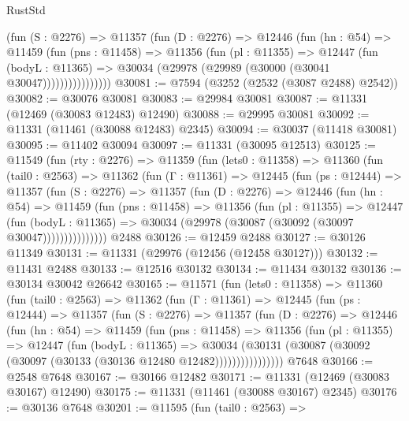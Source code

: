 \begin{lexlean}{RustStd}
\begin{coremodule}
                (fun (S : @2276) =>
                @11357
                  (fun (D : @2276) =>
                  @12446
                    (fun (hn : @54) =>
                    @11459
                      (fun (pns : @11458) =>
                      @11356
                        (fun (pl : @11355) =>
                        @12447
                          (fun (bodyL : @11365) =>
                          @30034 (@29978 (@29989 (@30000 (@30041 @30047))))))))))))))))
@30081 := @7594 (@3252 (@2532 (@3087 @2488) @2542))
@30082 := @30076 @30081
@30083 := @29984 @30081
@30087 := @11331 (@12469 (@30083 @12483) @12490)
@30088 := @29995 @30081
@30092 := @11331 (@11461 (@30088 @12483) @2345)
@30094 := @30037 (@11418 @30081)
@30095 := @11402 @30094
@30097 := @11331 (@30095 @12513)
@30125 := @11549
    (fun (rty : @2276) =>
    @11359
      (fun (lets0 : @11358) =>
      @11360
        (fun (tail0 : @2563) =>
        @11362
          (fun (Γ : @11361) =>
          @12445
            (fun (ps : @12444) =>
            @11357
              (fun (S : @2276) =>
              @11357
                (fun (D : @2276) =>
                @12446
                  (fun (hn : @54) =>
                  @11459
                    (fun (pns : @11458) =>
                    @11356
                      (fun (pl : @11355) =>
                      @12447
                        (fun (bodyL : @11365) =>
                        @30034 (@29978 (@30087 (@30092 (@30097 @30047)))))))))))))))
    @2488
@30126 := @12459 @2488
@30127 := @30126 @11349
@30131 := @11331 (@29976 (@12456 (@12458 @30127)))
@30132 := @11431 @2488
@30133 := @12516 @30132
@30134 := @11434 @30132
@30136 := @30134 @30042 @26642
@30165 := @11571
    (fun (lets0 : @11358) =>
    @11360
      (fun (tail0 : @2563) =>
      @11362
        (fun (Γ : @11361) =>
        @12445
          (fun (ps : @12444) =>
          @11357
            (fun (S : @2276) =>
            @11357
              (fun (D : @2276) =>
              @12446
                (fun (hn : @54) =>
                @11459
                  (fun (pns : @11458) =>
                  @11356
                    (fun (pl : @11355) =>
                    @12447
                      (fun (bodyL : @11365) =>
                      @30034
                        (@30131
                          (@30087 (@30092 (@30097 (@30133 (@30136 @12480 @12482))))))))))))))))
    @7648
@30166 := @2548 @7648
@30167 := @30166 @12482
@30171 := @11331 (@12469 (@30083 @30167) @12490)
@30175 := @11331 (@11461 (@30088 @30167) @2345)
@30176 := @30136 @7648
@30201 := @11595
    (fun (tail0 : @2563) =>

\end{coremodule}
\end{lexlean}
